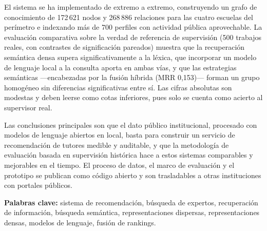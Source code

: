El sistema se ha implementado de extremo a extremo, construyendo un grafo de conocimiento de 172\,621 nodos y 268\,886 relaciones para las cuatro escuelas del perímetro e indexando más de 700 perfiles con actividad pública aprovechable.
La evaluación comparativa sobre la verdad de referencia de supervisión (500 trabajos reales, con contrastes de significación pareados) muestra que la recuperación semántica densa supera significativamente a la léxica, que incorporar un modelo de lenguaje local a la consulta aporta en ambas vías, y que las estrategias semánticas ---encabezadas por la fusión híbrida (MRR 0,153)--- forman un grupo homogéneo sin diferencias significativas entre sí.
Las cifras absolutas son modestas y deben leerse como cotas inferiores, pues solo se cuenta como acierto al supervisor real.

Las conclusiones principales son que el dato público institucional, procesado con modelos de lenguaje abiertos en local, basta para construir un servicio de recomendación de tutores medible y auditable, y que la metodología de evaluación basada en supervisión histórica hace a estos sistemas comparables y mejorables en el tiempo.
El proceso de datos, el marco de evaluación y el prototipo se publican como código abierto y son trasladables a otras instituciones con portales públicos.

\textbf{Palabras clave:} sistema de recomendación, búsqueda de expertos, recuperación de información, búsqueda semántica, representaciones dispersas, representaciones densas, modelos de lenguaje, fusión de rankings.
